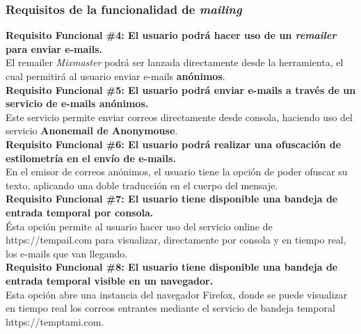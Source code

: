\subsubsection{Requisitos de la funcionalidad de \textit{mailing}}
\begin{adjustwidth}{0.5cm}{}
	\textbf{Requisito Funcional \#4: El usuario podrá hacer uso de un \textit{remailer} para enviar e-mails.}\\
	El remailer \textit{Mixmaster} podrá ser lanzada directamente desde la herramienta, el cual permitirá al usuario enviar e-mails \textbf{anónimos}.\\
	\linebreak
	\textbf{Requisito Funcional \#5: El usuario podrá enviar e-mails a través de un servicio de e-mails anónimos.}\\
	Este servicio permite enviar correos directamente desde consola, haciendo uso del servicio \textbf{Anonemail de Anonymouse}. \\
	\linebreak
	\textbf{Requisito Funcional \#6: El usuario podrá realizar una ofuscación de estilometría en el envío de e-mails.}\\
	En el emisor de correos anónimos, el usuario tiene la opción de poder ofuscar su texto, aplicando una doble traducción en el cuerpo del mensaje.\\
	\linebreak
	\textbf{Requisito Funcional \#7: El usuario tiene disponible una bandeja de entrada temporal por consola.}\\
	Ésta opción permite al usuario hacer uso del servicio online de https://tempail.com para visualizar, directamente por consola y en tiempo real, los e-mails que van llegando.\\
	\linebreak	
	\textbf{Requisito Funcional \#8: El usuario tiene disponible una bandeja de entrada temporal visible en un navegador.}\\
	Esta opción abre una instancia del navegador Firefox, donde se puede visualizar en tiempo real los correos entrantes mediante el servicio de bandeja temporal https://temptami.com.\\	
\end{adjustwidth}
